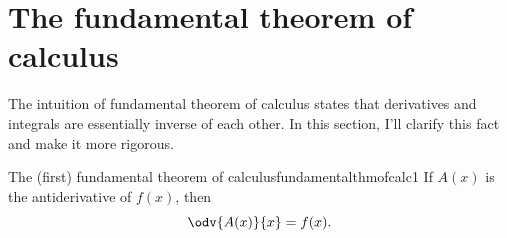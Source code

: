 \section{The fundamental theorem of calculus}
\label{sec:fundamentalthmofcalc}

The intuition of fundamental theorem of calculus states that derivatives and integrals are essentially inverse of each other. In this section, I'll clarify this fact and make it more rigorous.
\begin{theorem}{The (first) fundamental theorem of calculus}{fundamentalthmofcalc1}
	If $A(x)$ is the antiderivative of $f(x)$, then
	\begin{equation}
		\odv{A(x)}{x} = f(x).
	\end{equation}
\end{theorem}

